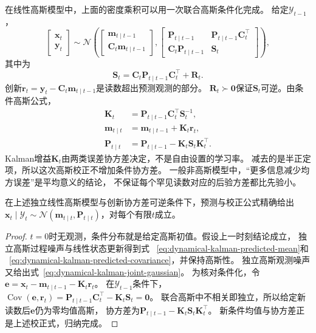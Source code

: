 在线性高斯模型中，上面的密度乘积可以用一次联合高斯条件化完成。
给定$\mathcal Y_{t-1}$，
\begin{equation}
 \begin{bmatrix}\bm x_t\\\bm y_t\end{bmatrix}
 \sim\mathcal N\left(
 \begin{bmatrix}\bm m_{t\mid t-1}\\\bm C_t\bm m_{t\mid t-1}\end{bmatrix},
 \begin{bmatrix}
  \bm P_{t\mid t-1}&\bm P_{t\mid t-1}\bm C_t^\top\\
  \bm C_t\bm P_{t\mid t-1}&\bm S_t
 \end{bmatrix}\right),
 \label{eq:dynamical-kalman-joint-gaussian}
\end{equation}
其中为
\begin{equation}
 \bm S_t=\bm C_t\bm P_{t\mid t-1}\bm C_t^\top+\bm R_t.
 \label{eq:dynamical-kalman-innovation-covariance}
\end{equation}
创新$\bm r_t=\bm y_t-\bm C_t\bm m_{t\mid t-1}$是读数超出预测观测的部分。
$\bm R_t\succ\bm0$保证$\bm S_t$可逆。由条件高斯公式，
\begin{align}
 \bm K_t&=\bm P_{t\mid t-1}\bm C_t^\top\bm S_t^{-1},
       \label{eq:dynamical-kalman-gain}\\
 \bm m_{t\mid t}&=\bm m_{t\mid t-1}+\bm K_t\bm r_t,
       \label{eq:dynamical-kalman-filtered-mean}\\
 \bm P_{t\mid t}&=\bm P_{t\mid t-1}-\bm K_t\bm S_t\bm K_t^\top.
       \label{eq:dynamical-kalman-filtered-covariance}
\end{align}
Kalman增益$\bm K_t$由两类误差协方差决定，不是自由设置的学习率。
减去的是半正定项，所以这次高斯校正不增加条件协方差。
一般非高斯模型中，“更多信息减少均方误差”是平均意义的结论，
不保证每个罕见读数对应的后验方差都比先验小。

\begin{theorem}[有限时域Kalman滤波]
 \label{thm:dynamical-finite-horizon-kalman-filter}
 在上述独立线性高斯模型与创新协方差可逆条件下，预测与校正公式精确给出
 $\bm x_t\mid\mathcal Y_t\sim
       \mathcal N(\bm m_{t\mid t},\bm P_{t\mid t})$，对每个有限$t$成立。
\end{theorem}
\begin{proof}
 $t=0$时无观测，条件分布就是给定高斯初值。假设上一时刻结论成立，
 独立高斯过程噪声与线性状态更新得到式
 ~\eqref{eq:dynamical-kalman-predicted-mean}和
 ~\eqref{eq:dynamical-kalman-predicted-covariance}，并保持高斯性。
 独立高斯观测噪声又给出式~\eqref{eq:dynamical-kalman-joint-gaussian}。
 为核对条件化，令$\bm e=\bm x_t-\bm m_{t\mid t-1}-\bm K_t\bm r_t$。
 在$\mathcal Y_{t-1}$条件下，
 $\operatorname{Cov}(\bm e,\bm r_t)
   =\bm P_{t\mid t-1}\bm C_t^\top-\bm K_t\bm S_t=\bm0$。
 联合高斯中不相关即独立，所以给定新读数后$\bm e$仍为零均值高斯，
 协方差为$\bm P_{t\mid t-1}-\bm K_t\bm S_t\bm K_t^\top$。
 新条件均值与协方差正是上述校正式，归纳完成。
\end{proof}

